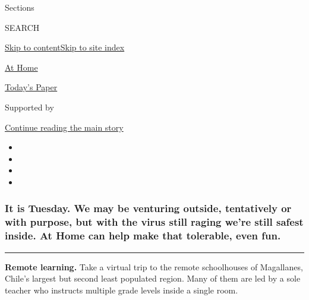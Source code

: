 Sections

SEARCH

\protect\hyperlink{site-content}{Skip to
content}\protect\hyperlink{site-index}{Skip to site index}

\href{https://www.nytimes.com/spotlight/at-home}{At Home}

\href{https://myaccount.nytimes.com/auth/login?response_type=cookie\&client_id=vi}{}

\href{https://www.nytimes.com/section/todayspaper}{Today's Paper}

Supported by

\protect\hyperlink{after-sponsor}{Continue reading the main story}

\begin{itemize}
\item
\item
\item
\item
\end{itemize}

\hypertarget{it-is-tuesday-we-may-be-venturing-outside-tentatively-or-with-purpose-but-with-the-virus-still-raging-were-still-safest-inside-at-home-can-help-make-that-tolerable-even-fun}{%
\subsubsection{\texorpdfstring{\textbf{It is Tuesday.} We may be
venturing outside, tentatively or with purpose, but with the virus still
raging we're still safest inside. \textbf{At Home} can help make that
tolerable, even
fun.}{It is Tuesday. We may be venturing outside, tentatively or with purpose, but with the virus still raging we're still safest inside. At Home can help make that tolerable, even fun.}}\label{it-is-tuesday-we-may-be-venturing-outside-tentatively-or-with-purpose-but-with-the-virus-still-raging-were-still-safest-inside-at-home-can-help-make-that-tolerable-even-fun}}

\begin{center}\rule{0.5\linewidth}{\linethickness}\end{center}

\textbf{Remote learning.} Take a virtual trip to the remote schoolhouses
of Magallanes, Chile's largest but second least populated region. Many
of them are led by a sole teacher who instructs multiple grade levels
inside a single room.

\href{https://www.nytimes.com/2020/08/03/travel/remote-schools-patagonia.html?action=click\&module=RelatedLinks\&pgtype=collection}{}


